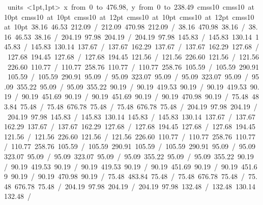 \hbox{\beginpicture
\setcoordinatesystem units <1pt,1pt>
\setplotarea x from 0 to 476.98, y from 0 to 238.49
\setlinear
\font\picfont cmss10\picfont
\font\picfont cmss10 at 10pt\picfont
\font\picfont cmss10 at 10pt\picfont
\font\picfont cmss10 at 12pt\picfont
\font\picfont cmss10 at 10pt\picfont
\font\picfont cmss10 at 12pt\picfont
\font\picfont cmss10 at 10pt\picfont
\setsolid
\setsolid
{} 38.16 46.53 212.09 /
 212.09 470.98 212.09 /
 38.16 470.98 38.16 /
 38.16 46.53 38.16 /
\setsolid
{} 204.19 97.98 204.19 /
 204.19 97.98 145.83 /
 145.83 130.14 145.83 /
 145.83 130.14 137.67 /
 137.67 162.29 137.67 /
 137.67 162.29 127.68 /
 127.68 194.45 127.68 /
 127.68 194.45 121.56 /
 121.56 226.60 121.56 /
 121.56 226.60 110.77 /
 110.77 258.76 110.77 /
 110.77 258.76 105.59 /
 105.59 290.91 105.59 /
 105.59 290.91 95.09 /
 95.09 323.07 95.09 /
 95.09 323.07 95.09 /
 95.09 355.22 95.09 /
 95.09 355.22 90.19 /
 90.19 419.53 90.19 /
 90.19 419.53 90.19 /
 90.19 451.69 90.19 /
 90.19 451.69 90.19 /
 90.19 470.98 90.19 /
 75.48 483.84 75.48 /
 75.48 676.78 75.48 /
 75.48 676.78 75.48 /
\setsolid
{} 204.19 97.98 204.19 /
 204.19 97.98 145.83 /
 145.83 130.14 145.83 /
 145.83 130.14 137.67 /
 137.67 162.29 137.67 /
 137.67 162.29 127.68 /
 127.68 194.45 127.68 /
 127.68 194.45 121.56 /
 121.56 226.60 121.56 /
 121.56 226.60 110.77 /
 110.77 258.76 110.77 /
 110.77 258.76 105.59 /
 105.59 290.91 105.59 /
 105.59 290.91 95.09 /
 95.09 323.07 95.09 /
 95.09 323.07 95.09 /
 95.09 355.22 95.09 /
 95.09 355.22 90.19 /
 90.19 419.53 90.19 /
 90.19 419.53 90.19 /
 90.19 451.69 90.19 /
 90.19 451.69 90.19 /
 90.19 470.98 90.19 /
 75.48 483.84 75.48 /
 75.48 676.78 75.48 /
 75.48 676.78 75.48 /
\setdashpattern <4pt, 4pt>
 204.19 97.98 204.19 /
 204.19 97.98 132.48 /
 132.48 130.14 132.48 /
}
